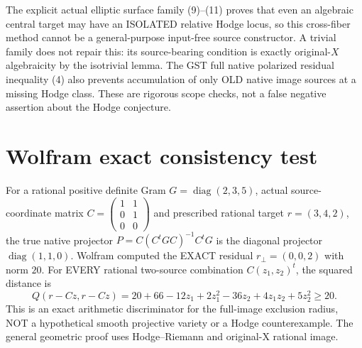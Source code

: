 \documentclass[11pt]{article}
\begin{document}
The explicit
actual
elliptic
surface
family
(9)--(11)
proves that
even an
algebraic
central
target may
have an
ISOLATED
relative
Hodge locus,
so this
cross-fiber
method cannot
be a
general-purpose
input-free
source
constructor.
A trivial
family does
not repair
this:
its
source-bearing
condition
is exactly
original-\(X\)
algebraicity
by the
isotrivial
lemma.
The GST
full native
polarized
residual
inequality (4)
also prevents
accumulation
of only
OLD native
image
sources at
a missing
Hodge class.
These are
rigorous
scope checks,
not a
false
negative
assertion
about the
Hodge
conjecture.

\section{Wolfram exact consistency test}
For a rational positive
definite Gram
\(G=\operatorname{diag}(2,3,5)\),
actual source-coordinate matrix
\(
C=\left(\begin{smallmatrix}1&1\\0&1\\0&0
\end{smallmatrix}\right)
\)
and prescribed rational target
\(r=(3,4,2)\), the true
native projector
\(
P=C(C^tGC)^{-1}C^tG
\)
is the diagonal projector
\(\operatorname{diag}(1,1,0)\).
Wolfram computed the EXACT
residual \(r_\perp=(0,0,2)\)
with norm \(20\).
For EVERY rational
two-source combination
\(C(z_1,z_2)^t\),
the squared distance is
\[
 Q(r-Cz,r-Cz)=20+
 66-12z_1+2z_1^2-36z_2+
               4z_1z_2+5z_2^2
 \ge20 .
\]
This is an exact arithmetic
discriminator for the full-image
exclusion radius, NOT a
hypothetical smooth projective
variety or a Hodge counterexample.
The general geometric proof
uses Hodge--Riemann and
original-X rational image.
\end{document}
